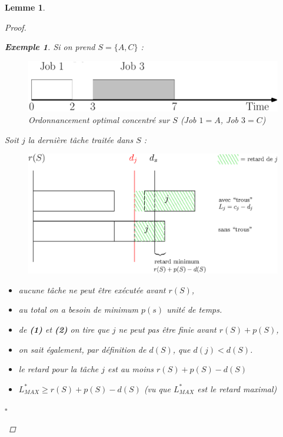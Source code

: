 \documentclass[12pt]{article}
\newcommand{\cqfd}{\begin{flushright}$\square$\end{flushright}}
\newtheorem{exemple}{Exemple}[section]
\newtheorem{lemme}{Lemme}[section]
\newtheorem{proof}{Preuve}[section]
\begin{document}
\begin{lemme}
\begin{proof}
\begin{exemple}
Si on prend $S = \{A,C\}$ :
\begin{figure}[h!]
    \begin{center}
    \includegraphics[scale=0.2]{ordoPart.pdf}
    \caption{Ordonnancement optimal concentré sur $S$ \textit{(Job $1 = A$,
    Job $3 = C$)}}
    \end{center}
\end{figure}
\end{exemple}
Soit $j$ la dernière tâche traitée dans $S$ :
 \begin{figure}[H]
 	\centering
 	\includegraphics{ordo.eps}
 \end{figure}
\begin{itemize}
	\item[\textbf{(1)}] aucune tâche ne peut être exécutée avant $r(S)$,
	\item[\textbf{(2)}] au total on a besoin de minimum $p(s)$ unité de temps.
	\item[$\rightarrow$] de \textbf{(1)} et \textbf{(2)} on tire que $j$ ne peut
    pas être finie avant $r(S)+p(S)$,
  	\item[$\rightarrow$] on sait également, par définition de $d(S)$, que
    $d(j) < d(S)$.
  	\item[$\rightarrow$] le retard pour la tâche $j$ est au moins
    $r(S)+p(S) - d(S)$
  	\item[$\hookrightarrow$] $L^*_{MAX} \geq r(S)+p(S)-d(S)$ (vu que
    $L^*_{MAX}$ est le retard maximal)
 \end{itemize}
 \cqfd
\end{proof}
\end{lemme}
\end{document}

